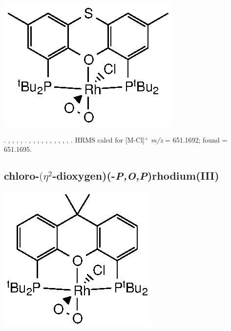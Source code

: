 \begin{structure}[h]
\begin{center}
\includegraphics{../Structures/StBuRhClO2.eps}
\end{center}
\end{structure}



.
,
,
,
,
.
,
,
,
,
,
,
,
,
,
,
.
HRMS calcd for  [M-Cl]$^+$ \emph{m/z} = 651.1692; found = 651.1695.


\subsection*{chloro-$(\eta^2$-dioxygen)(\tBuxantphosk-\emph{P,O,P})rhodium(III)}



\begin{structure}[h]
\begin{center}
\includegraphics{../Structures/CtBuRhClO2.eps}
\end{center}
\end{structure}

